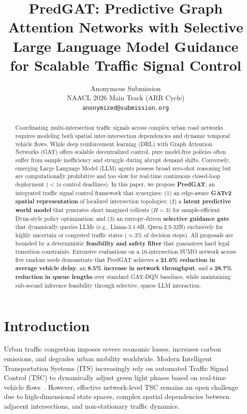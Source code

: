 \documentclass[11pt,a4paper]{article}
\title{PredGAT: Predictive Graph Attention Networks with Selective Large Language Model Guidance for Scalable Traffic Signal Control}
\author{
  Anonymous Submission \\
  NAACL 2026 Main Track (ARR Cycle) \\
  \texttt{anonymized@submission.org}
}
\date{}
\begin{document}
\maketitle

\begin{abstract}
Coordinating multi-intersection traffic signals across complex urban road networks requires modeling both spatial inter-intersection dependencies and dynamic temporal vehicle flows. While deep reinforcement learning (DRL) with Graph Attention Networks (GAT) offers scalable decentralized control, pure model-free policies often suffer from sample inefficiency and struggle during abrupt demand shifts. Conversely, emerging Large Language Model (LLM) agents possess broad zero-shot reasoning but are computationally prohibitive and too slow for real-time continuous closed-loop deployment ($<1$s control deadlines). In this paper, we propose \textbf{PredGAT}, an integrated traffic signal control framework that synergizes: (1) an edge-aware \textbf{GATv2 spatial representation} of localized intersection topologies; (2) a \textbf{latent predictive world model} that generates short imagined rollouts ($H=3$) for sample-efficient Dyna-style policy optimization; and (3) an entropy-driven \textbf{selective guidance gate} that dynamically queries LLMs (e.g., Llama-3.1-8B, Qwen-2.5-32B) exclusively for highly uncertain or congested traffic states ($\approx 3\%$ of decision steps). All proposals are bounded by a deterministic \textbf{feasibility and safety filter} that guarantees hard legal transition constraints. Extensive evaluations on a 16-intersection SUMO network across five random seeds demonstrate that PredGAT achieves a \textbf{21.6\% reduction in average vehicle delay}, an \textbf{8.5\% increase in network throughput}, and a \textbf{28.7\% reduction in queue lengths} over standard GAT-DQN baselines, while maintaining sub-second inference feasibility through selective, sparse LLM interaction.
\end{abstract}

\section{Introduction}
\label{sec:intro}
Urban traffic congestion imposes severe economic losses, increases carbon emissions, and degrades urban mobility worldwide. Modern Intelligent Transportation Systems (ITS) increasingly rely on automated Traffic Signal Control (TSC) to dynamically adjust green light phases based on real-time vehicle flows~\cite{wei2019presslight,chen2020toward}. However, effective network-level TSC remains an open challenge due to high-dimensional state spaces, complex spatial dependencies between adjacent intersections, and non-stationary traffic dynamics.
\end{document}
